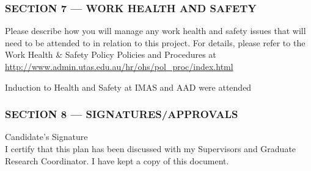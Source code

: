 \documentclass[11pt,a4paper,oneside]{report}
\begin{document}
\subsubsection*{SECTION 7 --- WORK HEALTH AND SAFETY}
Please describe how you will manage any work health and safety issues that will need to be attended to in relation to this project. For details, please refer to the Work Health \& Safety Policy Policies and Procedures at \url{http://www.admin.utas.edu.au/hr/ohs/pol_proc/index.html}

\begin{mdframed}[everyline=true,splittopskip=20pt,splitbottomskip=20pt]
\vspace{5ex}
Induction to Health and Safety at IMAS and AAD were attended
\vspace{5ex}
\end{mdframed}


\clearpage
\subsubsection*{SECTION 8 --- SIGNATURES/APPROVALS}

Candidate’s Signature\\
I certify that this plan has been discussed with my Supervisors and Graduate Research Coordinator.  I have kept a copy of this document.
\end{document}
